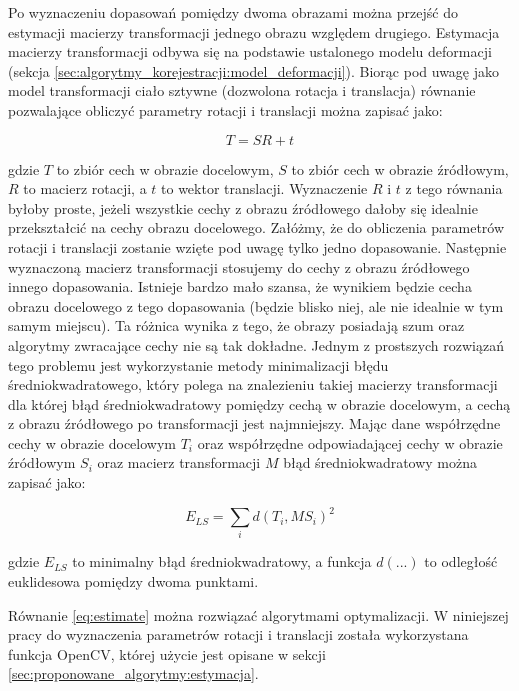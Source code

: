 Po wyznaczeniu dopasowań pomiędzy dwoma obrazami można przejść do estymacji macierzy transformacji jednego obrazu względem drugiego. Estymacja macierzy transformacji odbywa się na podstawie ustalonego modelu deformacji (sekcja \ref{sec:algorytmy_korejestracji:model_deformacji}). Biorąc pod uwagę jako model transformacji ciało sztywne (dozwolona rotacja i translacja) równanie pozwalające obliczyć parametry rotacji i translacji można zapisać jako:

\begin{equation}
T=SR+t
\end{equation}

gdzie $T$ to zbiór cech w obrazie docelowym, $S$ to zbiór cech w obrazie źródłowym, $R$ to macierz rotacji, a $t$ to wektor translacji. Wyznaczenie $R$ i $t$ z tego równania byłoby proste, jeżeli wszystkie cechy z obrazu źródłowego dałoby się idealnie przekształcić na cechy obrazu docelowego. Załóżmy, że do obliczenia parametrów rotacji i translacji zostanie wzięte pod uwagę tylko jedno dopasowanie. Następnie wyznaczoną macierz transformacji stosujemy do cechy z obrazu źródłowego innego dopasowania. Istnieje bardzo mało szansa, że wynikiem będzie cecha obrazu docelowego z tego dopasowania (będzie blisko niej, ale nie idealnie w tym samym miejscu). Ta różnica wynika z tego, że obrazy posiadają szum oraz algorytmy zwracające cechy nie są tak dokładne. Jednym z prostszych rozwiązań tego problemu jest wykorzystanie metody minimalizacji błędu średniokwadratowego, który polega na znalezieniu takiej macierzy transformacji dla której błąd średniokwadratowy pomiędzy cechą w obrazie docelowym, a cechą z obrazu źródłowego po transformacji jest najmniejszy. Mając dane współrzędne cechy w obrazie docelowym $T_{i}$ oraz współrzędne odpowiadającej cechy w obrazie źródłowym $S_{i}$ oraz macierz transformacji $M$ błąd średniokwadratowy można zapisać jako:

\begin{equation}
E_{LS}=\sum_{i}d(T_{i}, MS_{i})^2
\label{eq:estimate}
\end{equation}

gdzie $E_{LS}$ to minimalny błąd średniokwadratowy, a funkcja $d(...)$ to odległość euklidesowa pomiędzy dwoma punktami.

Równanie \ref{eq:estimate} można rozwiązać algorytmami optymalizacji. W niniejszej pracy do wyznaczenia parametrów rotacji i translacji została wykorzystana funkcja OpenCV, której użycie jest opisane w sekcji \ref{sec:proponowane_algorytmy:estymacja}.

